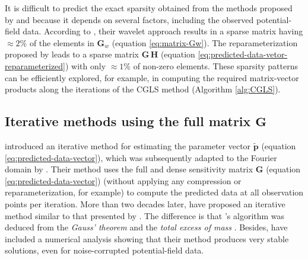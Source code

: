 \documentclass[utf8]{FrontiersinHarvard} %
\begin{document}
	It is difficult to predict the exact sparsity obtained from the methods proposed by \citet{li-oldenburg2010} and \citet{barnes-lumley2011} 
	because it depends on several factors, including the observed potential-field data.
	According to \citet{li-oldenburg2010}, their wavelet approach results in a sparse matrix having $\approx 2\%$ 
	of the elements in $\mathbf{G}_{w}$ (equation \ref{eq:matrix-Gw}).
	The reparameterization proposed by \citet{barnes-lumley2011} leads to a sparse matrix $\mathbf{G \, H}$ (equation \ref{eq:predicted-data-vetor-reparameterized})
	with only $\approx 1\%$ of non-zero elements.
	These sparsity patterns can be efficiently explored, for example, in computing the required matrix-vector products
	along the iterations of the CGLS method (Algorithm \ref{alg:CGLS}).
	
	
	\subsection{Iterative methods using the full matrix $\mathbf{G}$}
	
	\citet{xia-sprowl1991} introduced an iterative method for estimating the parameter vector $\tilde{\mathbf{p}}$ 
	(equation \ref{eq:predicted-data-vector}), which was subsequently adapted to the Fourier domain by \citet{xia-etal1993}.
	Their method uses the full and dense sensitivity matrix $\mathbf{G}$ (equation \ref{eq:predicted-data-vector})
	(without applying any compression or reparameterization, for example) to compute the predicted data
	at all observation points per iteration.
	More than two decades later, \cite{siqueira-etal2017} have proposed an iterative method similar to that presented by \citet{xia-sprowl1991}.
	The difference is that \citeauthor{siqueira-etal2017}'s algorithm was deduced from 
	the \textit{Gauss' theorem} \cite[e.g.,][p. 43]{kellogg1967} and the \textit{total excess of mass} \cite[e.g.,][p. 60]{blakely1996}.
	Besides, \citet{siqueira-etal2017} have included a numerical analysis showing that their method produces very stable solutions, 
	even for noise-corrupted potential-field data.
	
\end{document}
